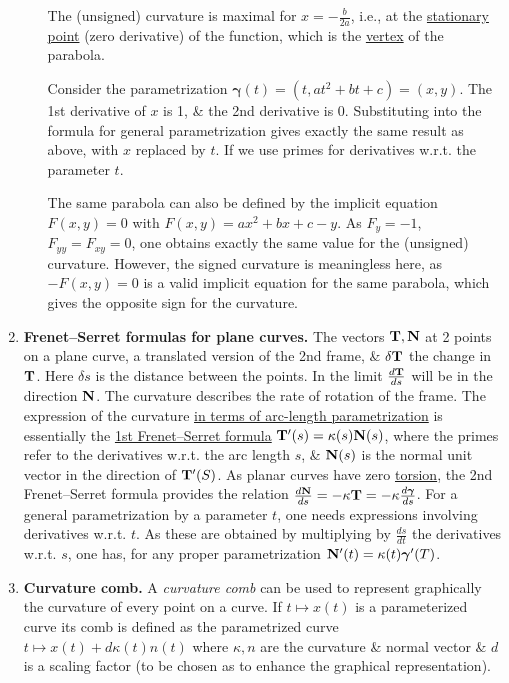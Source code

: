 \documentclass{article}
\begin{document}
\begin{enumerate}
\begin{enumerate}
		The (unsigned) curvature is maximal for $x = -\frac{b}{2a}$, i.e., at the \href{https://en.wikipedia.org/wiki/Stationary_point}{stationary point} (zero derivative) of the function, which is the \href{https://en.wikipedia.org/wiki/Vertex_(curve)}{vertex} of the parabola.
		
		Consider the parametrization $\boldsymbol{\gamma}(t) = (t,at^2 + bt + c) = (x,y)$. The 1st derivative of $x$ is 1, \& the 2nd derivative is 0. Substituting into the formula for general parametrization gives exactly the same result as above, with $x$ replaced by $t$. If we use primes for derivatives w.r.t. the parameter $t$.
		
		The same parabola can also be defined by the implicit equation $F(x,y) = 0$ with $F(x,y) = ax^2 + bx + c - y$. As $F_y = -1$, $F_{yy} = F_{xy} = 0$, one obtains exactly the same value for the (unsigned) curvature. However, the signed curvature is meaningless here, as $-F(x,y) = 0$ is a valid implicit equation for the same parabola, which gives the opposite sign for the curvature.
	\end{enumerate}	
	\item {\bf Frenet--Serret formulas for plane curves.} {\sf The vectors ${\bf T},{\bf N}$ at 2 points on a plane curve, a translated version of the 2nd frame, \& $\delta{\bf T}$ the change in ${\bf T}$. Here $\delta s$ is the distance between the points. In the limit $\frac{d{\bf T}}{ds}$ will be in the direction ${\bf N}$. The curvature describes the rate of rotation of the frame.} The expression of the curvature \href{https://en.wikipedia.org/wiki/Curvature#In_terms_of_arc-length_parametrization}{in terms of arc-length parametrization} is essentially the \href{https://en.wikipedia.org/wiki/Frenet%E2%80%93Serret_formulas}{1st Frenet--Serret formula} ${\bf T}'(s) = \kappa(s){\bf N}(s)$, where the primes refer to the derivatives w.r.t. the arc length $s$, \& ${\bf N}(s)$ is the normal unit vector in the direction of ${\bf T}'(S)$. As planar curves have zero \href{https://en.wikipedia.org/wiki/Torsion_of_curves}{torsion}, the 2nd Frenet--Serret formula provides the relation $\frac{d{\bf N}}{ds} = -\kappa{\bf T} = -\kappa\frac{d\boldsymbol{\gamma}}{ds}$. For a general parametrization by a parameter $t$, one needs expressions involving derivatives w.r.t. $t$. As these are obtained by multiplying by $\frac{ds}{dt}$ the derivatives w.r.t. $s$, one has, for any proper parametrization ${\bf N}'(t) = \kappa(t)\boldsymbol{\gamma}'(T)$.
	\item {\bf Curvature comb.} A {\it curvature comb} can be used to represent graphically the curvature of every point on a curve. If $t\mapsto x(t)$ is a parameterized curve its comb is defined as the parametrized curve $t\mapsto x(t) + d\kappa(t)n(t)$ where $\kappa,n$ are the curvature \& normal vector \& $d$ is a scaling factor (to be chosen as to enhance the graphical representation).
\end{enumerate}
\end{document}
